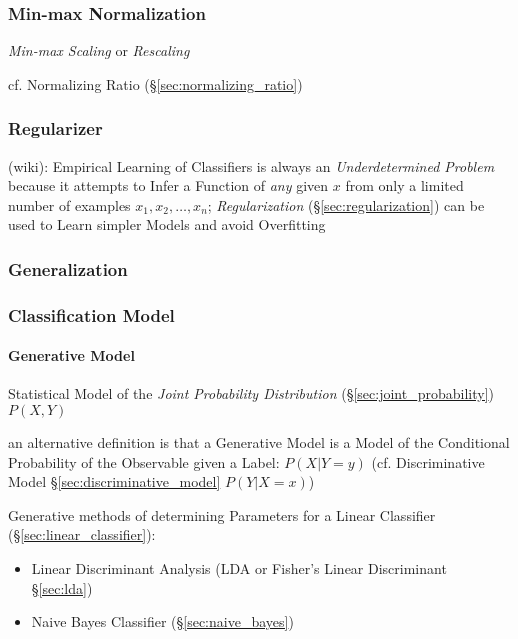 \subsubsection{Min-max Normalization}\label{sec:minmax_normalization}

\emph{Min-max Scaling} or \emph{Rescaling}

\fist cf. Normalizing Ratio (\S\ref{sec:normalizing_ratio})



\subsubsection{Regularizer}\label{sec:regularizer}

(wiki): Empirical Learning of Classifiers is always an \emph{Underdetermined
  Problem} because it attempts to Infer a Function of \emph{any} given $x$ from
only a limited number of examples $x_1, x_2, \ldots, x_n$; \emph{Regularization}
(\S\ref{sec:regularization}) can be used to Learn simpler Models and avoid
Overfitting



\subsubsection{Generalization}\label{sec:generalization}


\subsubsection{Classification Model}\label{sec:classification_model}

\paragraph{Generative Model}\label{sec:generative_model}\hfill

Statistical Model of the \emph{Joint Probability Distribution}
(\S\ref{sec:joint_probability}) $P(X,Y)$

an alternative definition is that a Generative Model is a Model of the
Conditional Probability of the Observable given a Label: $P(X|Y = y)$
(cf. Discriminative Model \S\ref{sec:discriminative_model} $P(Y|X = x)$)

Generative methods of determining Parameters for a Linear Classifier
(\S\ref{sec:linear_classifier}):
\begin{itemize}
  \item Linear Discriminant Analysis (LDA or Fisher's Linear Discriminant
    \S\ref{sec:lda})
  \item Naive Bayes Classifier (\S\ref{sec:naive_bayes})
\end{itemize}


